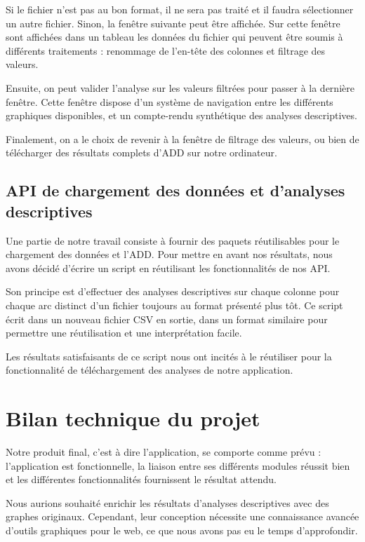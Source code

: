 			Si le fichier n'est pas au bon format, il ne sera pas traité et il faudra sélectionner un autre fichier. Sinon, la fenêtre suivante peut être affichée. Sur cette fenêtre sont affichées dans un tableau les données du fichier qui peuvent être soumis à différents traitements : renommage de l'en-tête des colonnes et filtrage des valeurs.
			
			Ensuite, on peut valider l'analyse sur les valeurs filtrées pour passer à la dernière fenêtre. Cette fenêtre dispose d'un système de navigation entre les différents graphiques disponibles, et un compte-rendu synthétique des analyses descriptives. 
			
			Finalement, on a le choix de revenir à la fenêtre de filtrage des valeurs, ou bien de télécharger des résultats complets d'ADD sur notre ordinateur.
			
		\subsection{API de chargement des données et d'analyses descriptives}
			Une partie de notre travail consiste à fournir des paquets réutilisables pour le chargement des données et l'ADD. Pour mettre en avant nos résultats, nous avons décidé d'écrire un script en réutilisant les fonctionnalités de nos API.
			
			Son principe est d'effectuer des analyses descriptives sur chaque colonne pour chaque arc distinct d'un fichier toujours au format présenté plus tôt. Ce script écrit dans un nouveau fichier CSV en sortie, dans un format similaire pour permettre une réutilisation et une interprétation facile.
			
			Les résultats satisfaisants de ce script nous ont incités à le réutiliser pour la fonctionnalité de téléchargement des analyses de notre application.
		
		
	\section{Bilan technique du projet}
		Notre produit final, c'est à dire l'application, se comporte comme prévu : l'application est fonctionnelle, la liaison entre ses différents modules réussit bien et les différentes fonctionnalités fournissent le résultat attendu.
		
		Nous aurions souhaité enrichir les résultats d'analyses descriptives avec des graphes originaux. Cependant, leur conception nécessite une connaissance avancée d'outils graphiques pour le web, ce que nous avons pas eu le temps d'approfondir.

